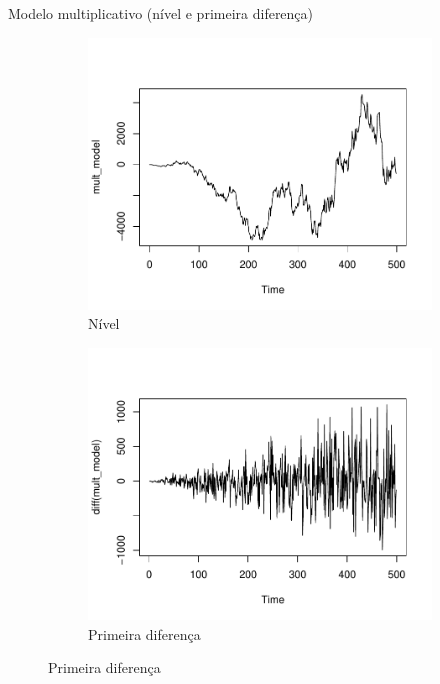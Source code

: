 \documentclass[11pt]{beamer}
\begin{document}
\begin{frame}{Modelo multiplicativo (nível e primeira diferença)}
	\begin{figure}
		\begin{subfigure}{0.45\textwidth}
			\centering
			\includegraphics[scale=0.4]{graficos/multiplicativo_nivel.pdf}
			\caption{Nível}
		\end{subfigure}
		\begin{subfigure}{0.45\textwidth}
			\centering
			\includegraphics[scale=0.4]{graficos/multiplicativo_diff.pdf}
			\caption{Primeira diferença}
		\end{subfigure}
	\end{figure}
\end{frame}
\end{document}
